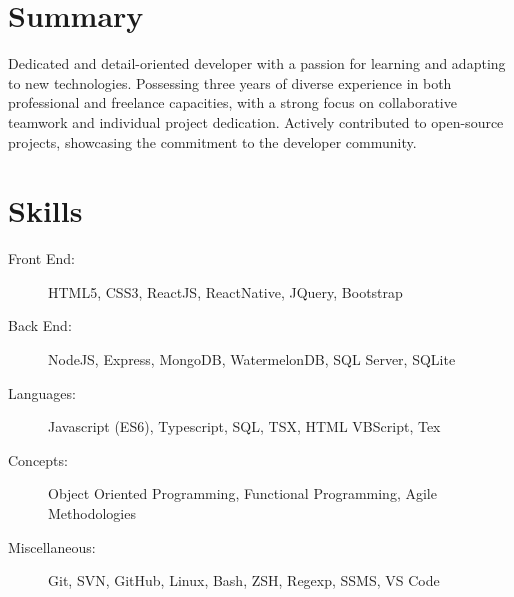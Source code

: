 \documentclass[a4paper,10pt]{article}
\begin{document}

\fancyhead[C]{
}


\section{Summary}

Dedicated and detail-oriented developer with a passion for learning and
adapting to new technologies. Possessing three years of diverse experience in both professional and freelance capacities,
with a strong focus on collaborative teamwork and individual project dedication.
Actively contributed to open-source projects, showcasing the commitment to the developer community.

\section{Skills}

\begin{description}
    \item[Front End:] HTML5, CSS3, ReactJS, ReactNative, JQuery, Bootstrap
    \item[Back End:] NodeJS, Express, MongoDB, WatermelonDB, SQL Server, SQLite
    \item[Languages:] Javascript (ES6), Typescript, SQL, TSX, HTML VBScript, Tex
    \item[Concepts:] Object Oriented Programming, Functional Programming, Agile Methodologies
    \item[Miscellaneous:] Git, SVN, GitHub, Linux, Bash, ZSH, Regexp, SSMS, VS Code
\end{description}
\end{document}
